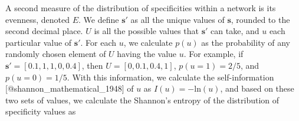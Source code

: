 A second measure of the distribution of specificities within a network
is its evenness, denoted $E$. We define $\mathbf{s}'$ as all the unique
values of $\mathbf{s}$, rounded to the second decimal place. $U$ is all the
possible values that $\mathbf{s}'$ can take, and $u$ each particular value
of $\mathbf{s}'$. For each $u$, we calculate $p(u)$ as the probability
of any randomly chosen element of $U$ having the value $u$. For example,
if $\mathbf{s}' = [0.1, 1, 1, 0, 0.4]$, then $U = [0, 0.1, 0.4, 1]$,
$p(u = 1) = 2 / 5$, and $p(u = 0) = 1 / 5$. With this information, we
calculate the self-information [@shannon_mathematical_1948] of $u$ as $I(u)
= -\mathrm{ln}(u)$, and based on these two sets of values, we calculate the
Shannon’s entropy of the distribution of specificity values as
